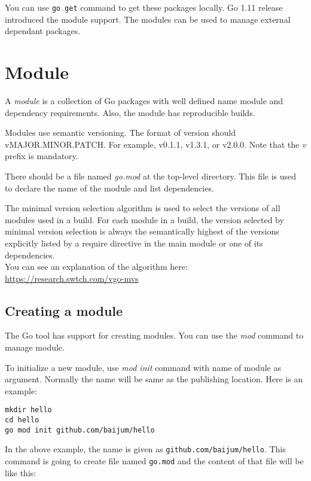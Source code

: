 You can use \texttt{go get} command to get these packages locally.  Go
1.11 release introduced the module support.  The modules can be used
to manage external dependant packages.

\section{Module}

A \textit{module} is a collection of Go packages with
well defined name module and dependency requirements.  Also, the module
has reproducible builds.

Modules use semantic versioning.  The format of version should
vMAJOR.MINOR.PATCH.  For example, v0.1.1, v1.3.1, or v2.0.0.  Note
that the \textit{v} prefix is mandatory.

There should be a file named \textit{go.mod} at the top-level
directory.  This file is used to declare the name of the module and
list dependencies.

The minimal version selection algorithm is used to select the versions
of all modules used in a build.  For each module in a build, the
version selected by minimal version selection is always the
semantically highest of the versions explicitly listed by a require
directive in the main module or one of its dependencies.\\

You can see an explanation of the algorithm here:\\
\url{https://research.swtch.com/vgo-mvs}

\subsection{Creating a module}

The Go tool has support for creating modules.  You can use
the \textit{mod} command to manage module.

To initialize a new module, use \textit{mod init} command with name of
module as argument.  Normally the name will be same as the publishing
location.  Here is an example:

\begin{lstlisting}[numbers=none]
mkdir hello
cd hello
go mod init github.com/baijum/hello
\end{lstlisting}

In the above example, the name is given
as \texttt{github.com/baijum/hello}.  This command is going to create
file named \texttt{go.mod} and the content of that file will be like
this:

